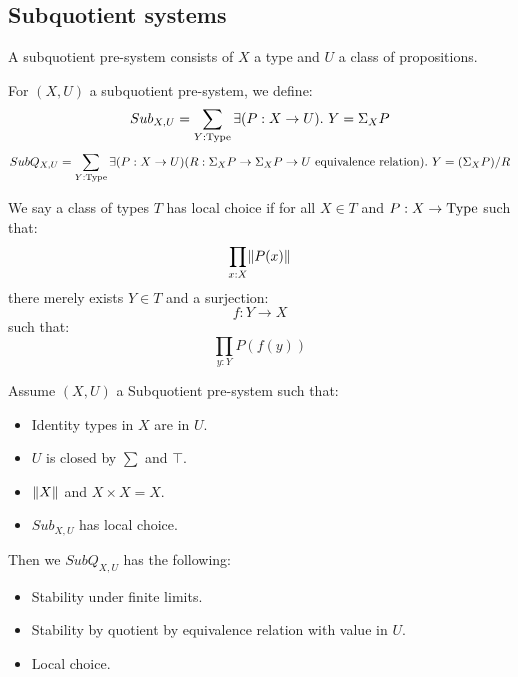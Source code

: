 \subsection{Subquotient systems}

\begin{definition}
A subquotient pre-system consists of $X$ a type and $U$ a class of propositions.
\end{definition}

\begin{definition}
For $(X,U)$ a subquotient pre-system, we define:
\[Sub_{X,U} = \sum_{Y:\Type} \exists (P : X\to U).\ Y = \Sigma_XP\]
\[SubQ_{X,U} = \sum_{Y:\Type} \exists (P : X\to U)(R: \Sigma_XP\to \Sigma_XP\to U\ \mathrm{equivalence\ relation}).\ Y = (\Sigma_XP)/R\]
\end{definition}

\begin{definition}
We say a class of types $T$ has local choice if for all $X\in T$ and $P:X\to\mathrm{Type}$ such that:
\[\prod_{x:X}\lVert P(x) \rVert\]
there merely exists $Y\in T$ and a surjection:
\[f:Y\to X\]
such that:
\[\prod_{y:Y}P(f(y))\]
\end{definition}

\begin{proposition}\label{lex-sub-pro}
Assume $(X,U)$ a Subquotient pre-system such that:
\begin{itemize}
\item Identity types in $X$ are in $U$.
\item $U$ is closed by $\sum$ and $\top$.
\item $\lVert X \rVert$ and $X\times X = X$.
\item $Sub_{X,U}$ has local choice.
\end{itemize}
Then we $SubQ_{X,U}$ has the following:
\begin{itemize}
\item Stability under finite limits.
\item Stability by quotient by equivalence relation with value in $U$.
\item Local choice.
\end{itemize}
\end{proposition}

